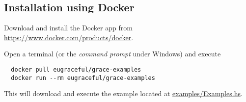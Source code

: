 \subsection{Installation using Docker}
\label{install-docker}

Download and install the Docker app from \url{https://www.docker.com/products/docker}.
%


Open a terminal (or the \emph{command prompt} under Windows) and
execute
\begin{verbatim}
  docker pull eugraceful/grace-examples
  docker run --rm eugraceful/grace-examples
\end{verbatim}

This will download and execute the example located at
\href{https://github.com/GRACeFUL-project/GRACe/blob/master/examples/Examples.hs}{examples/Examples.hs}.

